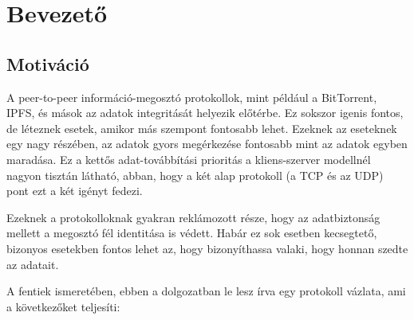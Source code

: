 \chapter{Bevezet\H{o}}\label{ch:BEV}

\section{Motiváció}\label{sec:BEV:mot}

A peer-to-peer információ-megosztó protokollok,
mint például a BitTorrent, IPFS, és mások az
adatok integritását helyezik előtérbe. Ez
sokszor igenis fontos, de léteznek esetek,
amikor más szempont fontosabb lehet. Ezeknek az
eseteknek egy nagy részében, az adatok gyors
megérkezése fontosabb mint az adatok egyben
maradása. Ez a kettős adat-továbbítási
prioritás a kliens-szerver modellnél nagyon
tisztán látható, abban, hogy a két alap
protokoll (a TCP és az UDP) pont ezt a két
igényt fedezi.

Ezeknek a protokolloknak gyakran reklámozott
része, hogy az adatbiztonság mellett a megosztó
fél identitása is védett. Habár ez sok esetben
kecsegtető, bizonyos esetekben fontos lehet az,
hogy bizonyíthassa valaki, hogy honnan szedte az
adatait.

A fentiek ismeretében, ebben a dolgozatban le
lesz írva egy protokoll vázlata, ami a
következőket teljesíti:


